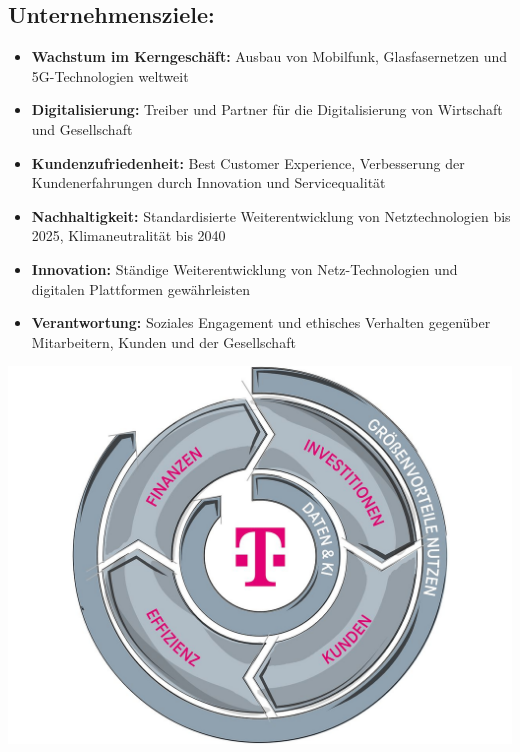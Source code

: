 \documentclass[12pt,a4paper]{article}
\begin{document}
	\subsection*{Unternehmensziele:}
	{\footnotesize
		\begin{itemize}[left=1.5em, itemsep=0.5pt]
			\item \textbf{Wachstum im Kerngeschäft:} Ausbau von Mobilfunk, Glasfasernetzen und 5G-Technologien weltweit
			\item \textbf{Digitalisierung:} Treiber und Partner für die Digitalisierung von Wirtschaft und Gesellschaft
			\item \textbf{Kundenzufriedenheit:} Best Customer Experience, Verbesserung der Kundenerfahrungen durch Innovation und Servicequalität
			\item \textbf{Nachhaltigkeit:} Standardisierte Weiterentwicklung von Netztechnologien bis 2025, Klimaneutralität bis 2040
			\item \textbf{Innovation:} Ständige Weiterentwicklung von Netz-Technologien und digitalen Plattformen gewährleisten
			\item \textbf{Verantwortung:} Soziales Engagement und ethisches Verhalten gegenüber Mitarbeitern, Kunden und der Gesellschaft
		\end{itemize}
	}
	
	\begin{flushleft}
		\begin{minipage}{5cm}
			\includegraphics[width=\linewidth]{./images/bi-strategie-schwungrad.jpg}
			\label{fig:bi-strategie-schwungrad}
		\end{minipage}
	\end{flushleft}
	
\end{document}
